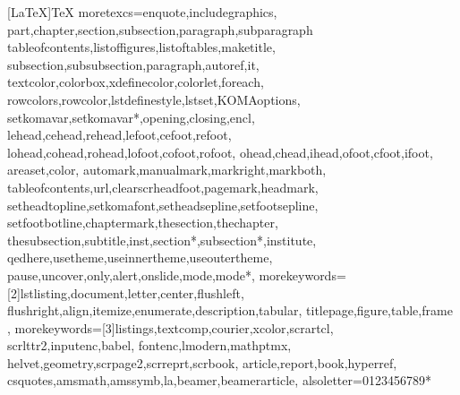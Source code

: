
\usepackage[utf8]{inputenc}
\usepackage[T1]{fontenc}

\usepackage{aurical}
\usepackage{mathptmx}
\usepackage[scaled]{helvet}
\usepackage{lmodern}
\usepackage{textcomp}
\usepackage[scaled=.88]{DejaVuSansMono}

\usepackage[ngerman]{babel}
\usepackage[german=guillemets]{csquotes}

\usepackage{amsmath}
\usepackage{nicefrac}

\usepackage{tikz}
\usetikzlibrary{positioning,%
  shapes.geometric,%
  shapes.misc,%
  calc,%
  fit,%
  decorations,%
  decorations.pathreplacing,%
  backgrounds,%
  arrows,%
  automata,%
  trees%
}

\usepackage{pifont}
\newcommand{\goodmark}{\textcolor<presentation>{green!50!black}{\Pisymbol{pzd}{52}}}
\newcommand{\badmark}{\textcolor<presentation>{red}{\Pisymbol{pzd}{56}}}



\usepackage{listings}
[LaTeX]{TeX}%
  {moretexcs={enquote,includegraphics,%
    part,chapter,section,subsection,paragraph,subparagraph%
    tableofcontents,listoffigures,listoftables,maketitle,%
    subsection,subsubsection,paragraph,autoref,it,%
    textcolor,colorbox,xdefinecolor,colorlet,foreach,%
    rowcolors,rowcolor,lstdefinestyle,lstset,KOMAoptions,%
    setkomavar,setkomavar*,opening,closing,encl,%
    lehead,cehead,rehead,lefoot,cefoot,refoot,%
    lohead,cohead,rohead,lofoot,cofoot,rofoot,%
    ohead,chead,ihead,ofoot,cfoot,ifoot,%
    areaset,color,%
    automark,manualmark,markright,markboth,%
    tableofcontents,url,clearscrheadfoot,pagemark,headmark,%
    setheadtopline,setkomafont,setheadsepline,setfootsepline,%
    setfootbotline,chaptermark,thesection,thechapter,%
    thesubsection,subtitle,inst,section*,subsection*,institute,
    qedhere,usetheme,useinnertheme,useoutertheme,
    pause,uncover,only,alert,onslide,mode,mode*},%
  morekeywords={[2]lstlisting,document,letter,center,flushleft,%
    flushright,align,itemize,enumerate,description,tabular,
    titlepage,figure,table,frame%
    },%
  morekeywords={[3]listings,textcomp,courier,xcolor,scrartcl,%
    scrlttr2,inputenc,babel,%
    fontenc,lmodern,mathptmx,%
    helvet,geometry,scrpage2,scrreprt,scrbook,%
    article,report,book,hyperref,%
    csquotes,amsmath,amssymb,la,beamer,beamerarticle},
  alsoletter={0123456789*}
  }%

